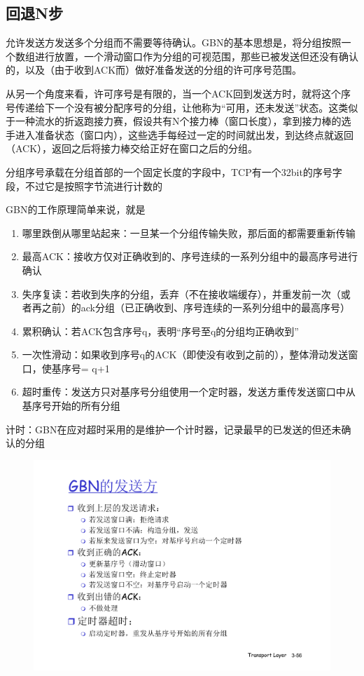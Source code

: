 \documentclass[]{report}
\begin{document}
		\subsection{回退N步}
			允许发送方发送多个分组而不需要等待确认。GBN的基本思想是，将分组按照一个数组进行放置，一个滑动窗口作为分组的可视范围，那些已被发送但还没有确认的，以及（由于收到ACK而）做好准备发送的分组的许可序号范围。\par
			从另一个角度来看，许可序号是有限的，当一个ACK回到发送方时，就将这个序号传递给下一个没有被分配序号的分组，让他称为“可用，还未发送”状态。这类似于一种流水的折返跑接力赛，假设共有N个接力棒（窗口长度），拿到接力棒的选手进入准备状态（窗口内），这些选手每经过一定的时间就出发，到达终点就返回（ACK），返回之后将接力棒交给正好在窗口之后的分组。\par
			分组序号承载在分组首部的一个固定长度的字段中，TCP有一个32bit的序号字段，不过它是按照字节流进行计数的\par
			GBN的工作原理简单来说，就是
			\begin{enumerate}
				\item 哪里跌倒从哪里站起来：一旦某一个分组传输失败，那后面的都需要重新传输
				\item 最高ACK：接收方仅对正确收到的、序号连续的一系列分组中的最高序号进行确认
				\item 失序复读：若收到失序的分组，丢弃（不在接收端缓存），并重发前一次（或者再之前）的ack分组（已正确收到、序号连续的一系列分组中的最高序号）
				\item 累积确认：若ACK包含序号q，表明“序号至q的分组均正确收到”
				\item 一次性滑动：如果收到序号q的ACK（即使没有收到之前的），整体滑动发送窗口，使基序号= q+1
				\item 超时重传：发送方只对基序号分组使用一个定时器，发送方重传发送窗口中从基序号开始的所有分组
			\end{enumerate}
			计时：GBN在应对超时采用的是维护一个计时器，记录最早的已发送的但还未确认的分组
			\begin{figure}
				\centering
				\begin{minipage}{40em}
					\centering
					\includegraphics[scale = 0.35]{images/GBN_Sender_Time_Counter.pdf}
				\end{minipage}
			\end{figure}
\end{document}

